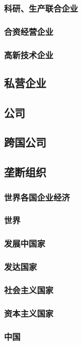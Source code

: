\documentclass[UTF8]{../../RepresentationUniverse}
\begin{document}
        \subsubsection{科研、生产联合企业}
        \subsubsection{合资经营企业}
        \subsubsection{高新技术企业}
    \subsection{私营企业}
    \subsection{公司}
    \subsection{跨国公司}
    \subsection{垄断组织}
\subsubsection{世界各国企业经济}
\subsubsection{世界}
\subsubsection{发展中国家}
\subsubsection{发达国家}
\subsubsection{社会主义国家}
\subsubsection{资本主义国家}
\subsubsection{中国}
\end{document}

